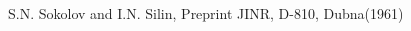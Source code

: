 \documentclass{webofc}
\begin{document}
\begin{thebibliography}{00}

 S.N. Sokolov and I.N. Silin, Preprint JINR, D-810, Dubna(1961)

%
%
%
%
%
%
%
%
%
%
%
%


\end{thebibliography}
\end{document}
